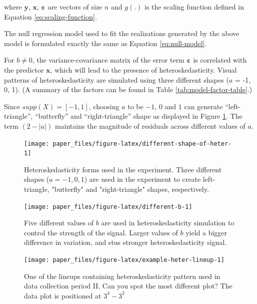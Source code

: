\documentclass[]{interact}
\theoremstyle{plain}%
\theoremstyle{definition}
\theoremstyle{remark}
\begin{document}
\noindent where \(\boldsymbol{y}\), \(\boldsymbol{x}\),
\(\boldsymbol{\varepsilon}\) are vectors of size \(n\) and \(g(.)\) is
the scaling function defined in Equation \ref{eq:scaling-function}.

The null regression model used to fit the realizations generated by the
above model is formulated exactly the same as Equation
\ref{eq:null-model}.

For \(b \neq 0\), the variance-covariance matrix of the error term
\(\boldsymbol{\varepsilon}\) is correlated with the predictor
\(\boldsymbol{x}\), which will lead to the presence of
heteroskedasticity. Visual patterns of heteroskedasticity are simulated
using three different shapes (\(a\) = -1, 0, 1). (A summary of the
factors can be found in Table \ref{tab:model-factor-table}.)

Since \(supp(X) = [-1, 1]\), choosing \(a\) to be \(-1\), \(0\) and
\(1\) can generate ``left-triangle'', ``butterfly'' and
``right-triangle'' shape as displayed in Figure
\ref{fig:different-shape-of-heter}. The term \((2 - |a|)\) maintains the
magnitude of residuals across different values of \(a\).

\begin{figure}

{\centering \texttt{[image: paper\_files/figure-latex/different-shape-of-heter-1]} 

}

\caption{Heteroskedasticity forms used in the experiment. Three different shapes ($a = -1, 0, 1$) are used in the experiment to create left-triangle, "butterfly" and "right-triangle" shapes, respectively.}\label{fig:different-shape-of-heter}
\end{figure}

\begin{figure}

{\centering \texttt{[image: paper\_files/figure-latex/different-b-1]} 

}

\caption{Five different values of $b$ are used in heteroskedasticity simulation to control the strength of the signal. Larger values of $b$ yield a bigger difference in variation, and stus stronger heteroskedasticity signal.}\label{fig:different-b}
\end{figure}

\begin{figure}

{\centering \texttt{[image: paper\_files/figure-latex/example-heter-lineup-1]} 

}

\caption{One of the lineups containing heteroskedasticity pattern used in data collection period II. Can you spot the most different plot? The data plot is positioned at $3^3 - 3^2$}\label{fig:example-heter-lineup}
\end{figure}
\end{document}
